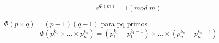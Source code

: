 $$ a^{\Phi(m)} = 1 (mod \; m) $$
\begin{center}
$\Phi(p \times q) = (p-1)(q-1)$ para pq primos
	$$\Phi(p_1^{k_1} \times ... \times p_n^{k_n}) = (p_1^{k_1} - p_1^{k_1 - 1} ) \times ... \times (p_n^{k_n} - p_n^{k_n - 1} )  $$
	

\end{center}
